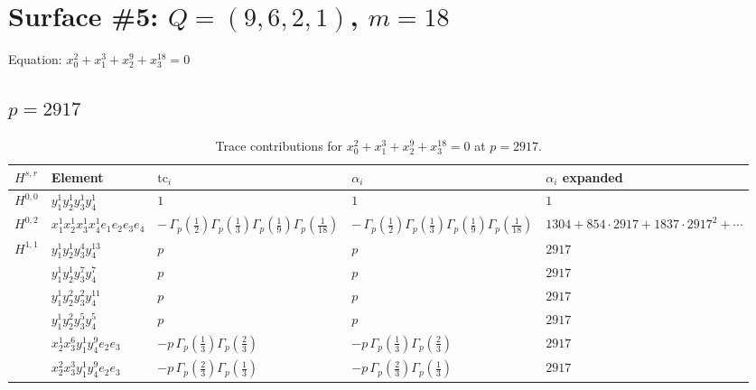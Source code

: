 \documentclass[11pt]{article}
\begin{document}
\newpage

\section*{Surface \#5: $Q=(9, 6, 2, 1)$, $m=18$}

Equation: $x_0^{2} + x_1^{3} + x_2^{9} + x_3^{18} = 0$

\subsection*{$p = 2917$}

\begin{table}[ht]
\centering
\caption{Trace contributions for $x_0^{2} + x_1^{3} + x_2^{9} + x_3^{18} = 0$ at $p=2917$.}\label{tab:diagonal-5}
\renewcommand{\arraystretch}{1.1}
{\scriptsize
\begin{tabular}{@{}lllll@{}}
\toprule
$H^{s,r}$ & Element & $\mathrm{tc}_i$ & $\alpha_i$ & $\alpha_i$ expanded \\
\midrule
$H^{0,0}$ & $y_{1}^{1} y_{2}^{1} y_{3}^{1} y_{4}^{1}$ & $1$ & $1$ & $1$ \\
\midrule
$H^{0,2}$ & $x_{1}^{1} x_{2}^{1} x_{3}^{1} x_{4}^{1}  e_{1} e_{2} e_{3} e_{4}$ & $- \, \Gamma_p \left( \frac{1}{2} \right) \Gamma_p \left( \frac{1}{3} \right) \Gamma_p \left( \frac{1}{9} \right) \Gamma_p \left( \frac{1}{18} \right)$ & $- \, \Gamma_p \left( \frac{1}{2} \right) \Gamma_p \left( \frac{1}{3} \right) \Gamma_p \left( \frac{1}{9} \right) \Gamma_p \left( \frac{1}{18} \right)$ & $1304{+}854{\cdot}2917{+}1837{\cdot}2917^{2}{+}\cdots$ \\
\midrule
$H^{1,1}$ & $y_{1}^{1} y_{2}^{1} y_{3}^{4} y_{4}^{13}$ & $p \,$ & $p \,$ & $2917$ \\
 & $y_{1}^{1} y_{2}^{1} y_{3}^{7} y_{4}^{7}$ & $p \,$ & $p \,$ & $2917$ \\
 & $y_{1}^{1} y_{2}^{2} y_{3}^{2} y_{4}^{11}$ & $p \,$ & $p \,$ & $2917$ \\
 & $y_{1}^{1} y_{2}^{2} y_{3}^{5} y_{4}^{5}$ & $p \,$ & $p \,$ & $2917$ \\
 & $x_{2}^{1} x_{3}^{6} y_{1}^{1} y_{4}^{9} e_{2} e_{3}$ & $- p \, \Gamma_p \left( \frac{1}{3} \right) \Gamma_p \left( \frac{2}{3} \right)$ & $- p \, \Gamma_p \left( \frac{1}{3} \right) \Gamma_p \left( \frac{2}{3} \right)$ & $2917$ \\
 & $x_{2}^{2} x_{3}^{3} y_{1}^{1} y_{4}^{9} e_{2} e_{3}$ & $- p \, \Gamma_p \left( \frac{2}{3} \right) \Gamma_p \left( \frac{1}{3} \right)$ & $- p \, \Gamma_p \left( \frac{2}{3} \right) \Gamma_p \left( \frac{1}{3} \right)$ & $2917$ \\

\end{tabular}}
\end{table}
\end{document}

